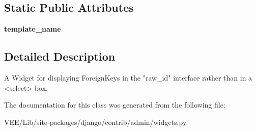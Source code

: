 \subsection*{Static Public Attributes}
\begin{DoxyCompactItemize}
\item 
\mbox{\label{classdjango_1_1contrib_1_1admin_1_1widgets_1_1_foreign_key_raw_id_widget_ae0890d10ce1d7b5d4e73494df29701e7}} 
{\bfseries template\+\_\+name}
\end{DoxyCompactItemize}


\subsection{Detailed Description}
\begin{DoxyVerb}A Widget for displaying ForeignKeys in the "raw_id" interface rather than
in a <select> box.
\end{DoxyVerb}
 

The documentation for this class was generated from the following file\+:\begin{DoxyCompactItemize}
\item 
V\+E\+E/\+Lib/site-\/packages/django/contrib/admin/widgets.\+py\end{DoxyCompactItemize}
